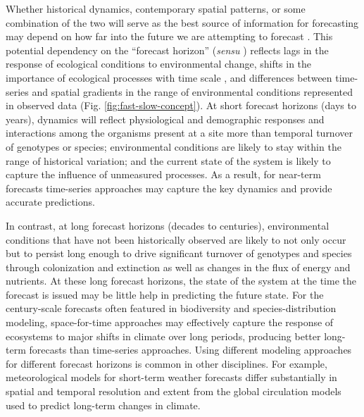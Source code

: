 \documentclass[11pt]{article}
\begin{document}
Whether historical dynamics, contemporary spatial patterns, or some combination of the two will serve as the best source of 
information for forecasting may depend on how far into the future we are attempting to forecast \citep{harris_forecasting_2018}. 
This potential dependency on the ``forecast horizon'' (\textit{sensu} \citealt{Hyndman2018})
reflects lags in the response of ecological conditions to environmental change, shifts in the importance of ecological processes with
time scale \citep{levin_1992,rosenzweig_1995}, and differences between time-series and spatial gradients in the range of 
environmental conditions represented in observed data (Fig. \ref{fig:fast-slow-concept}).
At short forecast horizons (days to years), dynamics will reflect physiological and demographic responses and interactions
among the organisms present at a site more than temporal turnover of genotypes or species; 
environmental conditions are likely to stay within the range of historical variation; 
and the current state of the system is likely to capture the influence of unmeasured processes. As a result, 
for near-term forecasts time-series approaches may capture the key dynamics and provide accurate predictions.

In contrast, at long forecast horizons (decades to centuries),  environmental conditions that have not been 
historically observed are likely to not only occur but to persist long enough to drive significant turnover of genotypes and species 
through colonization and extinction as well as changes in the flux of energy and nutrients.  
At these long forecast horizons, the state of the system at the time the forecast is issued may be 
little help in predicting the future state. For the century-scale forecasts often featured in biodiversity and 
species-distribution modeling, space-for-time approaches may effectively capture the response of ecosystems to major shifts 
in climate over long periods, producing better long-term forecasts than time-series approaches. 
Using different modeling approaches for different forecast horizons is common in other disciplines.
For example, meteorological models for short-term weather forecasts differ substantially in spatial
and temporal resolution and extent from the global circulation models used to predict long-term changes
in climate.
\end{document}
